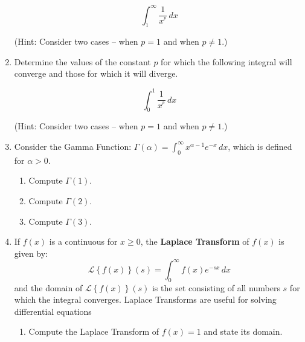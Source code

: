 \documentclass[12pt]{article}
\newif\ifans
\begin{document}
\begin{enumerate}
$$\int_1^\infty \frac{1}{x^{^p}} \,dx$$

(Hint: Consider two cases -- when $p=1$ and when $p \neq 1$.)

\ifans{\fbox{Converges to $\frac{1}{p-1}$ if $p>1$; Diverges if $p \leq 1$; Detailed Solution: \textcolor{blue}{\href{http://www.math.drexel.edu/classes/Calculus/resources/Math122HW/Solutions/122_13_Improper_17.pdf}{Here}}}} \fi

\newpage

\item Determine the values of the constant $p$ for which the following integral will converge and those for which it will diverge.  

$$\int_0^1 \frac{1}{x^{^p}} \,dx$$

(Hint: Consider two cases -- when $p=1$ and when $p \neq 1$.)

\ifans{\fbox{Converges to $\frac{1}{1-p}$ if $p<1$; Diverges if $p \geq 1$}} \fi

\item Consider the Gamma Function: $\Gamma(\alpha)=\int_0^{\infty} x^{\alpha-1}e^{-x} \,dx$, which is defined for $\alpha>0$.

\begin{enumerate}

\item Compute $\Gamma(1)$.

\ifans{\fbox{1}} \fi

\item Compute $\Gamma(2)$.

\ifans{\fbox{$1$}} \fi

\item Compute $\Gamma(3)$.

\ifans{\fbox{$2$}} \fi

\end{enumerate}

\item If $f(x)$ is a continuous for $x \geq 0$, the {\bf Laplace Transform} of $f(x)$ is given by: $$\mathcal{L}\left\{f(x)\right\}(s)=\int_0^{\infty} f(x)e^{-sx}\,dx$$
and the domain of $\mathcal{L}\left\{f(x)\right\}(s)$ is the set consisting of all numbers $s$ for which the integral converges.  Laplace Transforms are useful for solving differential equations

\begin{enumerate}

\item Compute the Laplace Transform of $f(x)=1$ and state its domain.


\end{enumerate}
\end{enumerate}
\end{document}
